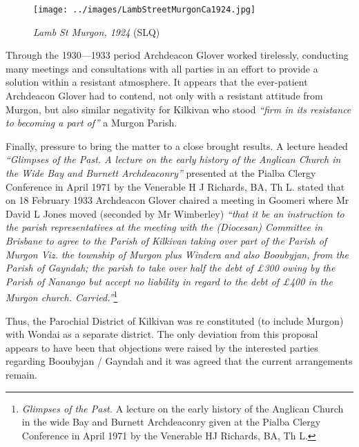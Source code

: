 \begin{figure}[htb]
\begin{center}
\texttt{[image: ../images/LambStreetMurgonCa1924.jpg]}
\caption{{\itshape Lamb St Murgon, 1924} {\scriptsize(SLQ)}}
\end{center}
\end{figure}


Through the 1930---1933 period Archdeacon Glover worked tirelessly, conducting many meetings and consultations with all parties in an effort to provide a solution within a resistant atmosphere. It appears that the ever-patient Archdeacon Glover had to contend, not only with a resistant attitude from Murgon, but also similar negativity for Kilkivan who stood \emph{``firm in its resistance to becoming a part of''} a Murgon Parish.



Finally, pressure to bring the matter to a close brought results. A lecture headed \emph{``Glimpses of the Past. A lecture on the early history of the Anglican Church in the Wide Bay and Burnett Archdeaconry''} presented at the Pialba Clergy Conference in April 1971 by the Venerable H J Richards, BA, Th L. stated that on 18 February 1933 Archdeacon Glover chaired a meeting in Goomeri where Mr David L Jones moved (seconded by Mr Wimberley) \emph{``that it be an instruction to the parish representatives at the meeting with the (Diocesan) Committee in Brisbane to agree to the Parish of Kilkivan taking over part of the Parish of Murgon Viz. the township of Murgon plus Windera and also Booubyjan, from the Parish of Gayndah; the parish to take over half the debt of \pounds300 owing by the Parish of Nanango but accept no liability in regard to the debt of \pounds400 in the Murgon church. Carried.''}\footnote{\emph{Glimpses of the Past.} A lecture on the early history of the Anglican Church in the wide Bay and Burnett Archdeaconry given at the Pialba Clergy Conference in April 1971 by the Venerable HJ Richards, BA, Th L.}


\balance


Thus, the Parochial District of Kilkivan was re constituted (to include Murgon) with Wondai as a separate district. The only deviation from this proposal appears to have been that objections were raised by the interested parties regarding Booubyjan / Gayndah and it was agreed that the current arrangements remain.




